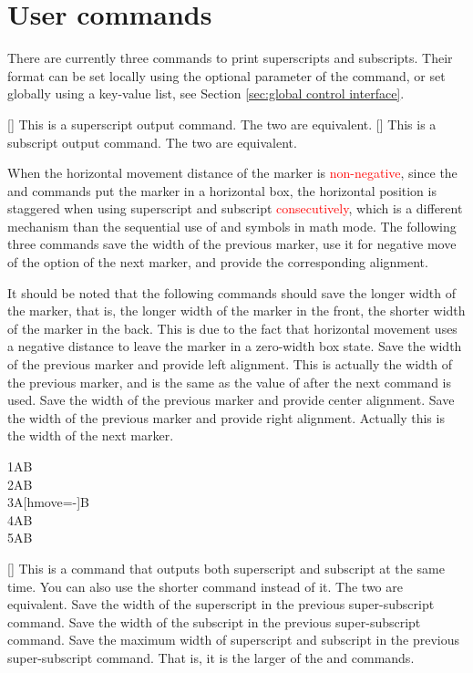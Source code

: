 \documentclass[load-preamble+]{cnltx-doc}
\renewcommand{\emph}[1]{\textcolor{red}{#1}}
\begin{document}
\section{User commands}
\label{sec:user commands}
There are currently three commands to print superscripts and subscripts. Their format can be set locally using the optional parameter of the command, or set globally using a key-value list, see Section \ref{sec:global control interface}.
\begin{commands}
  [\sarg{}]
  This is a superscript output command. The two  are equivalent.
  [\sarg{}]
  This is a subscript output command. The two  are equivalent.

  When the horizontal movement distance of the marker is \emph{non-negative}, since the  and  commands put the marker in a horizontal box, the horizontal position is staggered when using superscript and subscript \emph{consecutively}, which is a different mechanism than the sequential use of \code{\^{}} and \code{\_{}} symbols in math mode. The following three commands save the width of the previous marker, use it for negative move of the  option of the next marker, and provide the corresponding alignment.

  It should be noted that the following commands should save the longer width of the marker, that is, the longer width of the marker in the front, the shorter width of the marker in the back. This is due to the fact that horizontal movement uses a negative distance to leave the marker in a zero-width box state.
  Save the width of the previous marker and provide left alignment. This is actually the width of the previous marker, and is the same as the value of  after the next command is used.
  Save the width of the previous marker and provide center alignment. 
  Save the width of the previous marker and provide right alignment. Actually this is the width of the next marker.
\begin{demohigh}
1AB \\
2AB \\
3A[hmove=-\llastwd]B \\
4AB \\
5AB
\end{demohigh}
  [\sarg{}]
  This is a command that outputs both superscript and subscript at the same time. You can also use the shorter command  instead of it. The two  are equivalent.
  Save the width of the superscript in the previous super-subscript command.
  Save the width of the subscript in the previous super-subscript command.
  Save the maximum width of superscript and subscript in the previous super-subscript command. That is, it is the larger of the  and  commands.


\end{commands}
\end{document}

